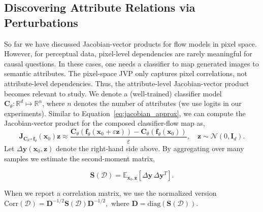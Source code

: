 \subsection{Discovering Attribute Relations via Perturbations}
\label{sec:jvp_attr}
So far we have discussed Jacobian-vector products for flow models in pixel space. However, for perceptual data, pixel-level dependencies are rarely meaningful for causal questions. In these cases, one needs a classifier to map generated images to semantic attributes. The pixel-space JVP only captures pixel correlations, not attribute-level dependencies. Thus, the attribute-level Jacobian-vector product becomes relevant to study.
We denote a (well-trained) classifier model $\mathbf{C}_{\theta} : \mathbb{R}^d \mapsto \mathbb{R}^n$, where $n$ denotes the number of attributes (we use logits in our experiments). Similar to Equation~\eqref{eq:jacobian_approx}, we can compute the Jacobian-vector product for the composed classifier-flow map as,
%
$$
\mathbf{J}_{\mathbf{C}_\theta \circ \mathbf{f}_\theta}(\mathbf{x}_0) \mathbf{z} \approx  \frac{\mathbf{C}_{\theta}(\mathbf{f}_\theta(\mathbf{x}_0 + \varepsilon\mathbf{z})) - \mathbf{C}_{\theta}(\mathbf{f}_\theta(\mathbf{x}_0))}{\varepsilon}, \quad \mathbf{z}\sim\mathcal{N}(0,\mathbf{I}_d).
$$
%
Let $\Delta \mathbf{y}(\mathbf{x}_0,\mathbf{z})$ denote the right-hand side above. By aggregating over many samples we estimate the second-moment matrix,

$$
\mathbf{S}(\mathcal{D}) = \mathbb{E}_{\mathbf{x}_0,\mathbf{z}} \left[\Delta \mathbf{y} \, \Delta \mathbf{y}^T \right].
$$

When we report a correlation matrix, we use the normalized version
$
\mathrm{Corr}(\mathcal{D}) = \mathbf{D}^{-1/2}\mathbf{S}(\mathcal{D})\mathbf{D}^{-1/2},
$
where $\mathbf{D}=\mathrm{diag}(\mathbf{S}(\mathcal{D}))$.

